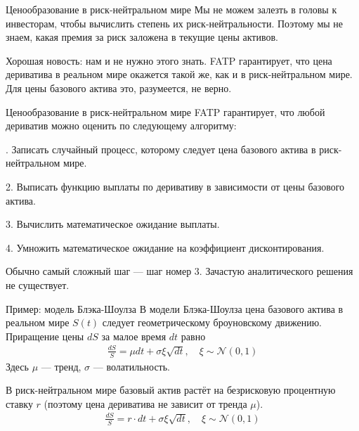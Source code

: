 \documentclass{beamer}
\begin{document}
\begin{frame}{Ценообразование в риск-нейтральном мире}
\justify
Мы не можем залезть в головы к инвесторам, чтобы вычислить степень их риск-нейтральности. Поэтому мы не знаем, какая премия за риск заложена в текущие цены активов.

\justify
Хорошая новость: нам и не нужно этого знать. FATP гарантирует, что цена дериватива в реальном мире окажется такой же, как и в риск-нейтральном мире. Для цены базового актива это, разумеется, не верно.
\end{frame}



\begin{frame}{Ценообразование в риск-нейтральном мире}
\justify
FATP гарантирует, что любой дериватив можно оценить 	по следующему алгоритму:

. Записать случайный процесс, которому следует цена базового актива в риск-нейтральном мире.

2. Выписать функцию выплаты по деривативу в зависимости от цены базового актива.

3. Вычислить математическое ожидание выплаты.

4. Умножить математическое ожидание на коэффициент дисконтирования.

\justify
Обычно самый сложный шаг --- шаг номер 3. Зачастую аналитического решения не существует.
\end{frame}



\begin{frame}{Пример: модель Блэка-Шоулза}
\justify
В модели Блэка-Шоулза цена базового актива в реальном мире $S(t)$ следует геометрическому броуновскому движению. Приращение цены $dS$ за малое время $dt$ равно
\begin{align*}
\frac{dS}{S} = \mu dt + \sigma  \xi \sqrt{dt}, \quad \xi \sim \mathcal{N}(0,1) 
\end{align*}
Здесь $\mu$ --- тренд, $\sigma$ --- волатильность.

\justify
В риск-нейтральном мире базовый актив растёт на безрисковую процентную ставку $r$ (поэтому цена дериватива не зависит от тренда $\mu$).
\begin{align*}
\frac{dS}{S} = r \cdot dt + \sigma \xi \sqrt{dt} , \quad \xi \sim \mathcal{N}(0,1) 
\end{align*}
\end{frame}
\end{document}
